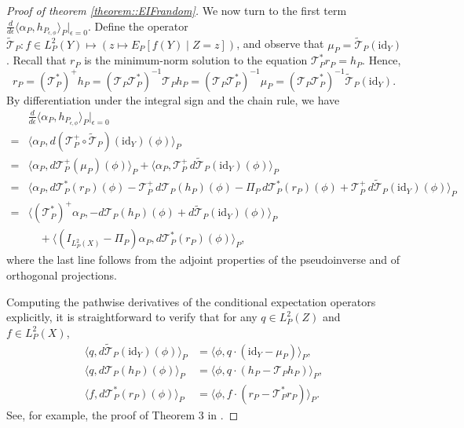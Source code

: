 \documentclass[11pt]{article}
\theoremstyle{plain}
\theoremstyle{definition}
\theoremstyle{remark}
\theoremstyle{definition}
\begin{document}
\begin{proof}[Proof of theorem \ref{theorem::EIFrandom}]
We now turn to the first term $ \frac{d}{d \epsilon} \langle \alpha_P, h_{P_{\epsilon, \phi}} \rangle_P \big|_{\epsilon = 0} $. Define the operator \( \tilde{\mathcal{T}}_P : f \in L^2_P(Y) \mapsto (z \mapsto E_P[f(Y) \mid Z = z]) \), and observe that \( \mu_P = \tilde{\mathcal{T}}_P(\mathrm{id}_Y) \). Recall that \( r_P \) is the minimum-norm solution to the equation \( \mathcal{T}_P^* r_P = h_P \). Hence,
\[
r_P = (\mathcal{T}_P^*)^+ h_P 
= (\mathcal{T}_P \mathcal{T}_P^*)^{-1} \mathcal{T}_P h_P 
= (\mathcal{T}_P \mathcal{T}_P^*)^{-1} \mu_P 
= (\mathcal{T}_P \mathcal{T}_P^*)^{-1} \tilde{\mathcal{T}}_P(\mathrm{id}_Y).
\]
By differentiation under the integral sign and the chain rule, we have
\begin{align*}
    &\frac{d}{d \epsilon} \langle \alpha_P, h_{P_{\epsilon, \phi}} \rangle_P \Big|_{\epsilon = 0} \\
    =& \langle \alpha_P, d(\mathcal{T}_P^+ \circ \tilde{\mathcal{T}}_P)(\mathrm{id}_Y)(\phi) \rangle_P \\
    =& \langle \alpha_P, d \mathcal{T}_P^+(\mu_P)(\phi) \rangle_P + \langle \alpha_P, \mathcal{T}_P^+ \, d \tilde{\mathcal{T}}_P(\mathrm{id}_Y)(\phi) \rangle_P \\
    =& \langle \alpha_P, d \mathcal{T}_P^*(r_P)(\phi) - \mathcal{T}_P^+ \, d \mathcal{T}_P(h_P)(\phi) - \Pi_P \, d \mathcal{T}_P^*(r_P)(\phi) + \mathcal{T}_P^+ \, d \tilde{\mathcal{T}}_P(\mathrm{id}_Y)(\phi) \rangle_P \\
    =& \langle (\mathcal{T}_P^*)^+ \alpha_P, - d \mathcal{T}_P(h_P)(\phi) + d \tilde{\mathcal{T}}_P(\mathrm{id}_Y)(\phi) \rangle_P \\
    &\quad + \langle (I_{L^2_P(X)} - \Pi_P) \alpha_P, d \mathcal{T}_P^*(r_P)(\phi) \rangle_P,
\end{align*}
where the last line follows from the adjoint properties of the pseudoinverse and of orthogonal projections.

Computing the pathwise derivatives of the conditional expectation operators explicitly, it is straightforward to verify that for any \( q \in L^2_P(Z) \) and \( f \in L^2_P(X) \),
\begin{align*}
    \langle q, d \tilde{\mathcal{T}}_P(\mathrm{id}_Y)(\phi) \rangle_P &= \langle \phi, q \cdot (\mathrm{id}_Y - \mu_P) \rangle_P, \\
    \langle q, d \mathcal{T}_P(h_P)(\phi) \rangle_P &= \langle \phi, q \cdot (h_P - \mathcal{T}_P h_P) \rangle_P, \\
    \langle f, d \mathcal{T}_P^*(r_P)(\phi) \rangle_P &= \langle \phi, f \cdot (r_P - \mathcal{T}_P^* r_P) \rangle_P.
\end{align*}
See, for example, the proof of Theorem 3 in \cite{van2025automatic}.



\end{proof}
\end{document}
